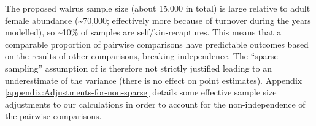 The proposed walrus sample size (about 15,000 in total) is large relative
to adult female abundance (\textasciitilde 70,000; effectively more
because of turnover during the years modelled), so \textasciitilde 10\%
of samples are self/kin-recaptures. This means that a comparable proportion
of pairwise comparisons have predictable outcomes based on the results
of other comparisons, breaking independence. The ``sparse sampling''
assumption of \citet{bravington_close-kin_2016} is therefore not
strictly justified leading to an underestimate of the variance (there
is no effect on point estimates). Appendix \ref{appendix:Adjustments-for-non-sparse}
details some effective sample size adjustments to our calculations
in order to account for the non-independence of the pairwise comparisons.
